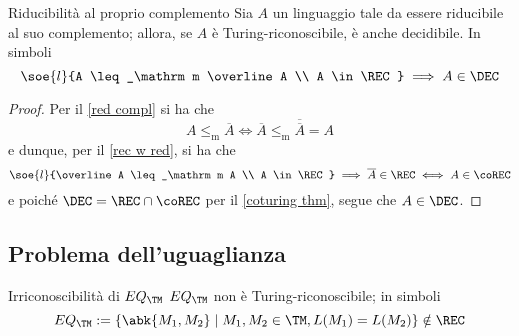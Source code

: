 \documentclass[a4paper, 12pt]{report}
\begin{document}
    \begin{framedcor}{Riducibilità al proprio complemento}
        Sia $A$ un linguaggio tale da essere riducibile al suo complemento; allora, se $A$ è Turing-riconoscibile, è anche decidibile. In simboli $$\soe{l}{A \leq_\mathrm m \overline A \\ A \in \REC} \implies A \in \DEC$$
    \end{framedcor}

    \begin{proof}
        Per il \cref{red compl} si ha che $$A \leq_\mathrm m \overline A \iff \overline A \leq_\mathrm m \overline {\overline A} = A$$ e dunque, per il \cref{rec w red}, si ha che $$\soe{l}{\overline A \leq_\mathrm m A \\ A \in \REC} \implies \overline A \in \REC \iff A \in \coREC$$ e poiché $\DEC = \REC \cap \coREC$ per il \cref{coturing thm}, segue che $A \in \DEC$.
    \end{proof}

    \subsection{Problema dell'uguaglianza}

    \begin{framedthm}[label={eq_tm not in rec}]{Irriconoscibilità di $EQ_\TM$}
        $EQ_\TM$ non è Turing-riconoscibile; in simboli $$EQ_\TM := \{\abk{M_1, M_2} \mid M_1, M_2 \in \TM, L(M_1) = L(M_2)\} \notin \REC$$
    \end{framedthm}
\end{document}
